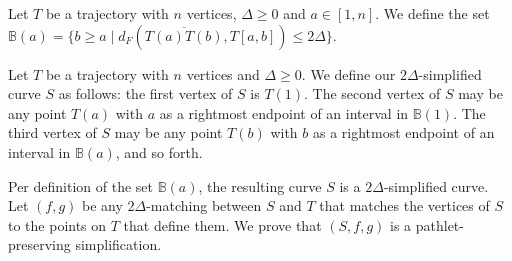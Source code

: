 \documentclass[a4paper,UKenglish,cleveref,thm-restate,notab]{lipics-v2021}
\newcommand{\dF}{\ensuremath{d_F}}
\newcommand{\B}{\mathbb{B}}
\begin{document}
    \begin{definition}
    \label{def:baset}
        Let $T$ be a trajectory with $n$ vertices, $\Delta \geq 0$ and $a \in [1, n]$. 
        We define the set $\B(a) = \{ b \geq a \mid \dF(\overline{T(a) T(b)}, T[a, b]) \leq 2\Delta \}$. 
    \end{definition}
        
    \begin{definition}
    \label{def:curve_S}
        Let $T$ be a trajectory with $n$ vertices and $\Delta \geq 0$.
        We define our $2\Delta$-simplified curve $S$ as follows: the first vertex of $S$ is $T(1)$. 
        The second vertex of $S$ may be any point $T(a)$ with $a$ as a rightmost endpoint of an interval in $\B(1)$.
        The third vertex of $S$ may be any point $T(b)$ with $b$ as a rightmost endpoint of an interval in $\B(a)$, and so forth. 
    \end{definition}
 
    Per definition of the set $\B(a)$, the resulting curve $S$ is a $2\Delta$-simplified curve.
    Let $(f, g)$ be any $2\Delta$-matching between $S$ and $T$ that matches the vertices of $S$ to the points on $T$ that define them.
    We prove that $(S, f, g)$ is a pathlet-preserving simplification.
    
\end{document}
